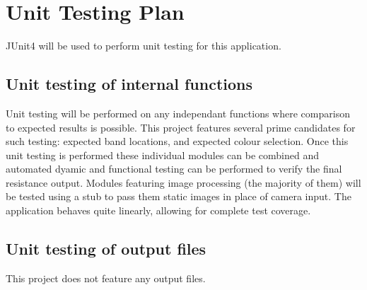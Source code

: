 \documentclass[12pt, titlepage]{article}
\begin{document}
\section{Unit Testing Plan}	
\par JUnit4 will be used to perform unit testing for this application.	
\subsection{Unit testing of internal functions}
\par Unit testing will be performed on any independant functions where comparison to expected results is possible. This project features several prime candidates for such testing: expected band locations, and expected colour selection. Once this unit testing is performed these individual modules can be combined and automated dyamic and functional testing can be performed to verify the final resistance output. Modules featuring image processing (the majority of them) will be tested using a stub to pass them static images in place of camera input. The application behaves quite linearly, allowing for complete test coverage.
\subsection{Unit testing of output files}		
\par This project does not feature any output files.


\end{document}
